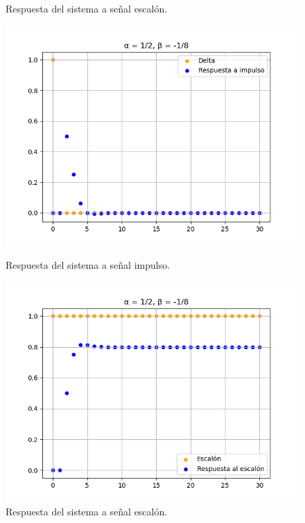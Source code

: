\begin{figure}[H]
\begin{minipage}[b]{0.49\textwidth}
    \caption{Respuesta del sistema a señal escalón.}
    \end{minipage}
\end{figure}

\begin{figure}[H]
    \centering
    \begin{minipage}[b]{0.49\textwidth}
    \includegraphics[width=\textwidth]{images/ej9_fig2_delta.png}
    \caption{Respuesta del sistema a señal impulso.}
    \end{minipage}
    \hfill
    \begin{minipage}[b]{0.49\textwidth}
    \includegraphics[width=\textwidth]{images/ej9_fig2_step.png}
    \caption{Respuesta del sistema a señal escalón.}
    \end{minipage}
\end{figure}

